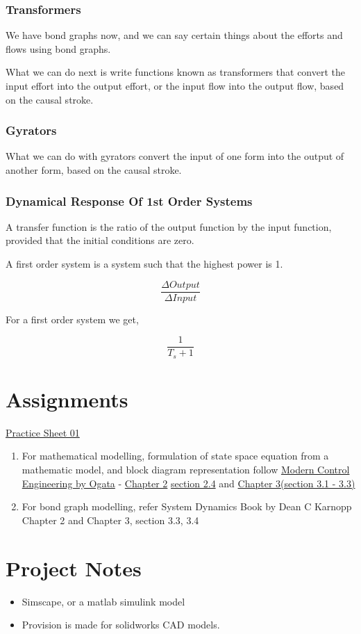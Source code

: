 \documentclass[11pt]{report}
\begin{document}
\section{Transformers}
\label{sec:orgb0195df}
We have bond graphs now, and we can say certain things about the efforts and flows using bond graphs.


What we can do next is write functions known as transformers that convert the input effort into the output effort, or the input flow into the output flow, based on the causal stroke.
\section{Gyrators}
\label{sec:org6f89a34}
What we can do with gyrators convert the input of one form into the output of another form, based on the causal stroke.
\section{Dynamical Response Of 1st Order Systems}
\label{sec:org0e26bcb}
A transfer function is the ratio of the output function by the input function, provided that the initial conditions are zero.

A first order system is a system such that the highest power is 1.

$$\frac{\Delta{Output}}{\Delta{Input}}$$

For a first order system we get,

$$\frac{1}{T_s+1}$$
\part{Assignments}
\label{sec:org904a0b1}
\href{file:///home/adithya/university-notes/Modelling, Simulation And Analysis/assignments/23AID201\_MSA\_PracticeSheet01.pdf}{Practice Sheet 01}
\begin{enumerate}
\item For mathematical modelling, formulation of state space equation from a mathematic model, and block diagram representation follow \href{file:///home/adithya/university-notes/Modelling, Simulation And Analysis/textbooks/Modern Control Engineering 5th Edition.pdf}{Modern Control Engineering by Ogata} - \href{file:///home/adithya/University-Latex-Notes/Modelling, Simulation And Analysis/textbooks/Modern Control Engineering 5th Edition.pdf}{Chapter 2} \href{file:///home/adithya/University-Latex-Notes/Modelling, Simulation And Analysis/textbooks/Modern Control Engineering 5th Edition.pdf}{section 2.4} and \href{file:///home/adithya/University-Latex-Notes/Modelling, Simulation And Analysis/textbooks/Modern Control Engineering 5th Edition.pdf}{Chapter 3(section 3.1 - 3.3)}

\item For bond graph modelling, refer System Dynamics Book by Dean C Karnopp Chapter 2 and Chapter 3, section 3.3, 3.4
\end{enumerate}
\part{Project Notes}
\label{sec:orgadf131c}
\begin{itemize}
\item Simscape, or a matlab simulink model
\item Provision is made for solidworks CAD models.
\end{itemize}
\end{document}
